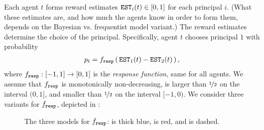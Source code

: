  Each agent $t$ forms reward estimates $\mathtt{EST}_i(t)\in [0,1]$ for each principal $i$. (What these estimates are, and how much the agents know in order to form them, depends on the Bayesian vs. frequentist model variant.)
The reward estimates determine the choice of the principal. Specifically, agent $t$ chooses principal $1$ with probability
\begin{align}\label{eq:model-f}
p_t = f_{\mathtt{resp}}\left(\, \mathtt{EST}_1(t) - \mathtt{EST}_2(t) \,\right),
\end{align}
where $f_{\mathtt{resp}}:[-1,1]\to [0,1]$ is the \emph{response function}, same for all agents. We assume that $f_{\mathtt{resp}}$ is monotonically non-decreasing, is larger than $\nicefrac12$ on the interval $(0,1]$, and smaller than $\nicefrac12$ on the interval $[-1,0)$. We consider three variants for $f_{\mathtt{resp}}$, depicted in  :

\begin{figure}[t]
\begin{center}
\end{center}
\caption{The three models for $f_{\mathtt{resp}}$: \HardMax is thick blue, \HardMaxRandom is red, and \SoftMaxRandom is dashed.}
\label{fig:response-functions}
\end{figure}

